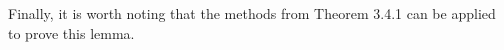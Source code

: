 \documentclass[12pt,a4paper]{article}
\begin{document}
    Finally, it is worth noting that the methods from Theorem 3.4.1 can be applied to prove this lemma.


    
    

%
%
%
%
%
%
%
%
%
%
%
\end{document}
